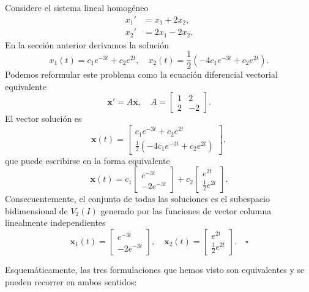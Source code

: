 \begin{example}\label{ex:vectorial}
Considere el sistema lineal homog\'eneo
\begin{align*}
    x_1' &= x_1 + 2x_2, \\
    x_2' &= 2x_1 - 2x_2.
\end{align*}
En la secci\'on anterior derivamos la soluci\'on
\[
x_1(t) = c_1e^{-3t} + c_2e^{2t}, \quad x_2(t) = \frac{1}{2}(-4c_1e^{-3t} + c_2e^{2t}).
\]
Podemos reformular este problema como la ecuaci\'on diferencial vectorial equivalente
\begin{equation}\label{eq:vect-ej}
    \mathbf{x}' = A\mathbf{x}, \quad A = \begin{bmatrix} 1 & 2 \\ 2 & -2 \end{bmatrix}.
\end{equation}
El vector soluci\'on es
\[
\mathbf{x}(t) = \begin{bmatrix} c_1e^{-3t} + c_2e^{2t} \\ \frac{1}{2}(-4c_1e^{-3t} + c_2e^{2t}) \end{bmatrix},
\]
que puede escribirse en la forma equivalente
\[
\mathbf{x}(t) = c_1 \begin{bmatrix} e^{-3t} \\ -2e^{-3t} \end{bmatrix} + c_2 \begin{bmatrix} e^{2t} \\ \frac{1}{2}e^{2t} \end{bmatrix}.
\]
Consecuentemente, el conjunto de todas las soluciones es el subespacio bidimensional de $V_2(I)$ generado por las funciones de vector columna linealmente independientes
\[
\mathbf{x}_1(t) = \begin{bmatrix} e^{-3t} \\ -2e^{-3t} \end{bmatrix}, \quad \mathbf{x}_2(t) = \begin{bmatrix} e^{2t} \\ \frac{1}{2}e^{2t} \end{bmatrix}. \quad \square
\]
\end{example}

Esquem\'aticamente, las tres formulaciones que hemos visto son equivalentes y se pueden recorrer en ambos sentidos:

